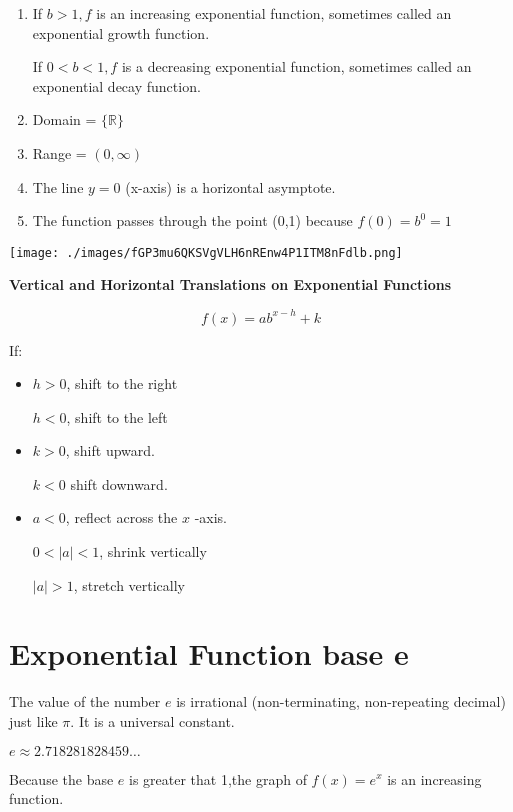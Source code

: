 \documentclass{book}
\begin{document}
\begin{enumerate}
	\item
	      If \(b>1,f\) is an increasing exponential function, sometimes called an exponential growth function.
		  
		  If \(0<b<1,f\) is a decreasing exponential function, sometimes called an exponential decay function.
	\item
	      Domain = \(\{\mathbb{R}\}\)
	\item
	      Range = \((0,\infty)\)
	\item
	      The line \(y=0\) (x-axis) is a horizontal asymptote.
	\item
	      The function passes through the point (0,1) because \(f(0)=b^{0}=1\)
\end{enumerate}

\texttt{[image: ./images/fGP3mu6QKSVgVLH6nREnw4P1ITM8nFdlb.png]}

\textbf{Vertical and Horizontal Translations on Exponential
	Functions}\label{vertical-and-horizontal-translations-on-exponential-functions}

\[f(x) = ab^{x-h}+k\]

If:

\begin{itemize}
	\item
		\(h>0\), shift to the right
		
		$h<0$, shift to the left
	\item
	      \(k>0\), shift upward.

	      \(k<0\) shift downward.
	\item
	      \(a<0\), reflect across the \(x\) -axis.

	      \(0<|a|<1\), shrink vertically

	      \(|a|>1\), stretch vertically
\end{itemize}

\section{Exponential Function base e}\label{exponential-function-base-e}

The value of the number \(e\) is irrational (non-terminating,
non-repeating decimal) just like \(\pi\). It is a universal constant.

\(e \approx 2.718281828459 \dots\)

Because the base \(e\) is greater that 1,the graph of \(f(x)=e^{x}\) is
an increasing function.
\end{document}
